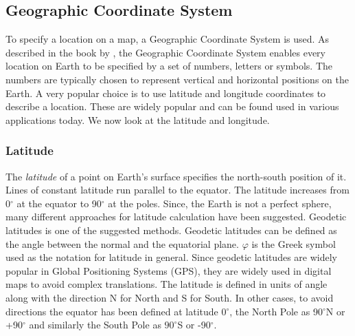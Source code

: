 \subsection{Geographic Coordinate System}
To specify a location on a map, a Geographic Coordinate System is used. As described in the book by \citet{chang2006introduction}, the Geographic Coordinate System enables every location on Earth to be specified by a set of numbers, letters or symbols. The numbers are typically chosen to represent vertical and horizontal positions on the Earth. A very popular choice is to use latitude and longitude coordinates to describe a location. These are widely popular and can be found used in various applications today. We now look at the latitude and longitude.  

\subsubsection{Latitude}
The \textit{latitude} of a point on Earth's surface specifies the north-south position of it. Lines of constant latitude run parallel to the equator. The latitude increases from 0$^{\circ}$ at the equator to 90$^{\circ}$ at the poles. Since, the Earth is not a perfect sphere, many different approaches for latitude calculation have been suggested. Geodetic latitudes is one of the suggested methods. Geodetic latitudes can be defined as the angle between the normal and the equatorial plane. $\varphi$ is the Greek symbol used as the notation for latitude in general. Since geodetic latitudes are widely popular in Global Positioning Systems (GPS), they are widely used in digital maps to avoid complex translations. The latitude is defined in units of angle along with the direction N for North and S for South. In other cases, to avoid directions the equator has been defined at latitude 0$^{\circ}$, the North Pole as 90$^{\circ}$N or +90$^{\circ}$ and similarly the South Pole as $90^{\circ}$S or -90$^{\circ}$. 

